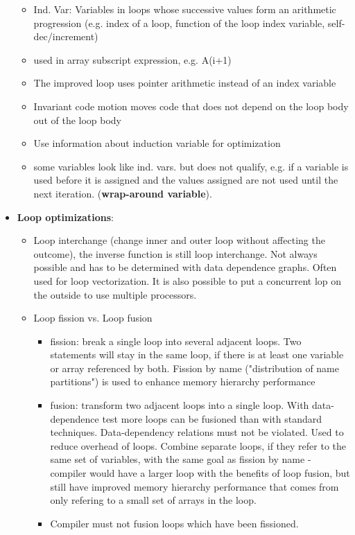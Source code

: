 \documentclass[a4paper,10pt]{article}
\begin{document}
\begin{itemize}
  \begin{itemize}
  	\item Ind. Var: Variables in loops whose successive values form an arithmetic progression (e.g. index of a loop, function of the loop index variable, self-dec/increment)
    \item used in array subscript expression, e.g. A(i+1)
    \item The improved loop uses pointer arithmetic instead of an index variable
    \item Invariant code motion moves code that does not depend on the loop body out of the loop body
    \item Use information about induction variable for optimization
    \item some variables look like ind. vars. but does not qualify, e.g. if a variable is used before it is assigned and the values assigned are not used until the next iteration. (\textbf{wrap-around variable}).
  \end{itemize}
  \item \textbf{Loop optimizations}:
     \begin{itemize}
     \item Loop interchange (change inner and outer loop without affecting the outcome), the inverse function is still loop interchange. Not always possible and has to be determined with data dependence graphs. Often used for loop vectorization. It is also possible to put a concurrent lop on the outside to use multiple processors.
     \item Loop fission vs. Loop fusion
     \begin{itemize}
     	\item fission: break a single loop into several adjacent loops. Two statements will stay in the same loop, if there is at least one variable or array referenced by both. Fission by name ("distribution of name partitions") is used to enhance memory hierarchy performance
        \item fusion: transform two adjacent loops into a single loop. With data-dependence test more loops can be fusioned than with standard techniques. Data-dependency relations must not be violated. Used to reduce overhead of loops. Combine separate loops, if they refer to the same set of variables, with the same goal as fission by name - compiler would have a larger loop with the benefits of loop fusion, but still have improved memory hierarchy performance that comes from only refering to a small set of arrays in the loop.
        \item Compiler must not fusion loops which have been fissioned.

\end{itemize}
\end{itemize}
\end{itemize}
\end{document}
